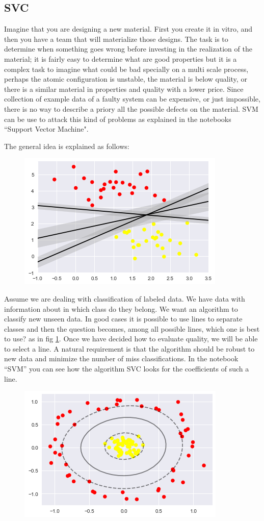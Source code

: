 \documentclass[11pt,letterpaper]{report}
\begin{document}
	\subsection{SVC}
	Imagine that you are designing a new material. First you create it in vitro, and then you have a team that will materialize those designs. The task is to determine when something goes wrong before investing in the realization of the material; it is fairly easy to determine what are good properties but it is a complex task to imagine what could be bad specially on a multi scale process, perhaps the atomic configuration is unstable, the material is below quality, or there is a similar  material in properties and quality  with a lower price.  Since collection of example data of a faulty system  can be expensive, or just impossible,  there is no way to describe a priory all the possible defects on the material. SVM can be use to attack this kind of problems as explained in the notebooks ``Support Vector Machine".
	
	The general idea is explained as follows:
	\begin{figure}[h!]
		\centering
		\includegraphics[width=0.45\linewidth]{figures/svcl.png}
		\caption{}
		\label{fig:lines}
	\end{figure} 
	
	Assume we are dealing with classification of labeled data. We have data with information about in which class do they belong. We want an algorithm to classify new unseen data. In good cases it is possible to use lines to separate classes and then the question becomes, among all possible lines, which one is best to use? as in fig \ref{fig:lines}. Once we have decided how to evaluate quality, we will be able to select a line. A natural requirement is that the algorithm should be robust to new data and minimize the number of miss classifications. In the notebook ``SVM'' you can see how the algorithm SVC looks for  the coefficients of such a line.

\begin{figure}[h!]
	\centering
	\includegraphics[width=0.45\linewidth]{figures/svc.png}
	\caption{}
	\label{fig:kernel}
\end{figure} 
	
\end{document}
